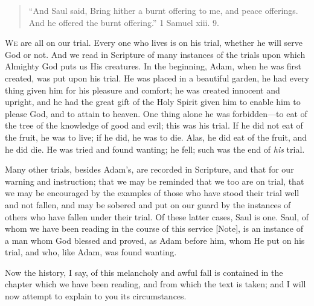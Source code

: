 
\begin{quote}

``And Saul said, Bring hither a burnt offering to me, and
peace offerings. And he offered the burnt offering.'' 1 Samuel
xiii. 9.

\end{quote}

W\textsc{e} are all on our trial. Every one who lives is on his trial,
whether he will serve God or not. And we read in Scripture of many
instances of the trials upon which Almighty God puts us His creatures.
In the beginning, Adam, when he was first created, was put upon his
trial. He was placed in a beautiful garden, he had every thing given
him for his pleasure and comfort; he was created innocent and upright,
and he had the great gift of the Holy Spirit given him to enable him
to please God, and to attain to heaven. One thing alone he was
forbidden—to eat of the tree of the knowledge of good and evil; this
was his trial. If he did not eat of the fruit, he was to live; if he
did, he was to die. Alas, he did eat of the fruit, and he did die. He
was tried and found wanting; he fell; such was the end of \emph{his}
trial.

Many other trials, besides Adam's, are recorded in Scripture, and
that for our warning and instruction; that we may be reminded that we
too are on trial, that we may be encouraged by the examples of those
who have stood their trial well and not fallen, and may be sobered and
put on our guard by the instances of others who have fallen under
their trial. Of these latter cases, Saul is one. Saul, of whom we have
been reading in the course of this service [Note],
is an instance of a man whom God blessed and proved, as Adam before
him, whom He put on his trial, and who, like Adam, was found wanting.

Now the history, I say, of this melancholy and awful fall is
contained in the chapter which we have been reading, and from which
the text is taken; and I will now attempt to explain to you its
circumstances.

